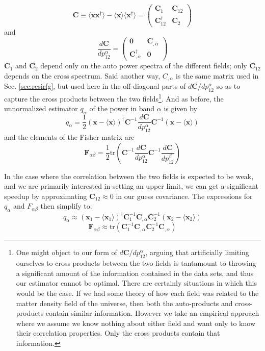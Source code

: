 \documentclass{emulateapj}
\newcommand{\Fb}{\mathbf{F}}
\newcommand{\Cb}{\mathbf{C}}
\newcommand{\xb}{\mathbf{x}}
\begin{document}
\begin{equation}
\Cb\equiv  \langle\xb\xb^\dagger\rangle-\langle\xb\rangle\langle\xb^\dagger\rangle=\left(\begin{matrix}\Cb_1 & \Cb_{12} \\ \Cb_{12}^\dagger & \Cb_2   \end{matrix}\right)
\end{equation}
and 
\begin{equation}
\frac{d\Cb}{dp_{12}^\alpha}=\left(\begin{matrix}\mathbf{0} & \Cb_{,\alpha}\\ \Cb_{,\alpha}^\dagger & \mathbf{0}   \end{matrix}\right)
\end{equation}
$\Cb_1$ and $\Cb_2$ depend only on the auto power spectra of the different fields; only $\Cb_{12}$ depends on the cross spectrum. Said another way, $C_{,\alpha}$ is the same matrix used in Sec. \ref{sec:resirfg}, but used here in the off-diagonal parts of $d\Cb/dp_{12}^\alpha$ so as to capture the cross products between the two fields\footnote{One might object to our form of $d\Cb/dp_{12}^\alpha$, arguing that artificially limiting ourselves to cross products between the two fields is tantamount to throwing a significant amount of the information contained in the data sets, and thus our estimator cannot be optimal. There are certainly situations in which this would be the case. If we had some theory of how each field was related to the matter density field of the universe, then both the auto-products and cross-products contain similar information. However we take an empirical approach where we assume we know nothing about either field and want only to know their correlation properties. Only the cross products contain that information.}. And as before, the unnormalized estimator $q_\alpha$ of the power in band $\alpha$ is given by
\begin{equation}
q_\alpha = \frac{1}{2}(\xb-\langle\xb\rangle)^\dagger \Cb^{-1} \frac{d\Cb}{dp_{12}^\alpha}\Cb^{-1}(\xb-\langle\xb\rangle)
\end{equation}
and the elements of the Fisher matrix are
\begin{equation}
\Fb_{\alpha\beta}=\frac{1}{2}\text{tr}\left(\Cb^{-1} \frac{d\Cb}{dp_{12}^\alpha} \Cb^{-1}  \frac{d\Cb}{dp_{12}^\beta}  \right)	
\end{equation}

In the case where the correlation between the two fields is expected to be weak, and we are primarily interested in setting an upper limit, we can get a significant speedup by approximating $\Cb_{12}\approx0$ in our guess covariance. The expressions for $q_\alpha$ and $F_{\alpha\beta}$ then simplify to:
\begin{equation}
q_\alpha \approx (\xb_1-\langle\xb_1\rangle)^\dagger \Cb_1^{-1} \Cb_{,\alpha}\Cb_2^{-1}(\xb_2-\langle\xb_2\rangle)
\end{equation}
\begin{equation}
\Fb_{\alpha\beta}\approx\text{tr}\left(\Cb_1^{-1} \Cb_{,\alpha} \Cb_2^{-1}  \Cb_{,\alpha}  \right)	
\end{equation}
\end{document}
